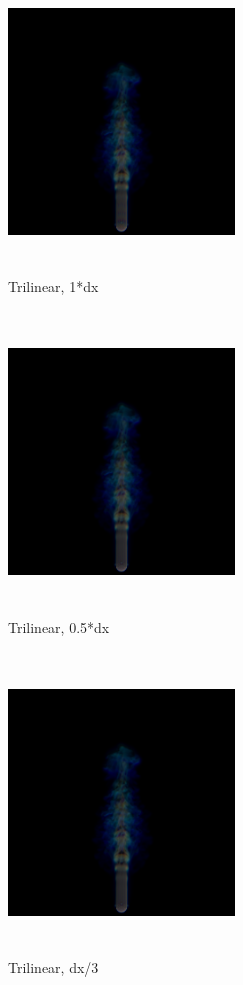 \documentclass[acmtog]{acmart}
\begin{document}
\begin{figure}[h]
	\centering
	\includegraphics[width=6cm,height=8cm]{Trilinear+1.png}
	\caption{Trilinear, 1*dx}
\end{figure}
\begin{figure}[h]
	\centering
	\includegraphics[width=6cm,height=8cm]{Trilinear+half.png}
	\caption{Trilinear, 0.5*dx}
\end{figure}
\begin{figure}[h]
	\centering
	\includegraphics[width=6cm,height=8cm]{Trilinear+120.png}
	\caption{Trilinear, dx/3}
\end{figure}
\end{document}

